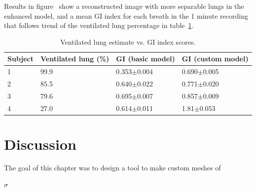 Results in figure~ show a reconstructed image 
with more separable lungs in the enhanced model, and a mean GI index for each breath in the 
1 minute 
recording that follows 
trend of the ventilated lung percentage in table~\ref{tbl:twocol}.

\begin{table}
  \centering
  \caption{\label{tbl:twocol} %
  Ventilated lung estimate vs. GI index scores.}
  \begin{tabular}{|p{1.2cm}|p{1.5cm}|p{1.8cm}|p{1.7cm}|}
    \hline
  Subject & Ventilated lung (\%) &
  GI (basic model) & GI (custom model) \\ \hline
  1 & 99.9 & 0.353$\pm$0.004& 0.690$\pm$0.005 \\ 
  2 & 85.5 & 0.640$\pm$0.022& 0.771$\pm$0.020  \\
  3 & 79.6 & 0.695$\pm$0.007& 0.857$\pm$0.009  \\
  4 & 27.0 & 0.614$\pm$0.011&  1.81$\pm$0.053 \\\hline
  \end{tabular}
  \vspace{-1em} 
\end{table}

\section{Discussion}

The goal of this chapter was to design a tool to make custom meshes of 

$\sigma$